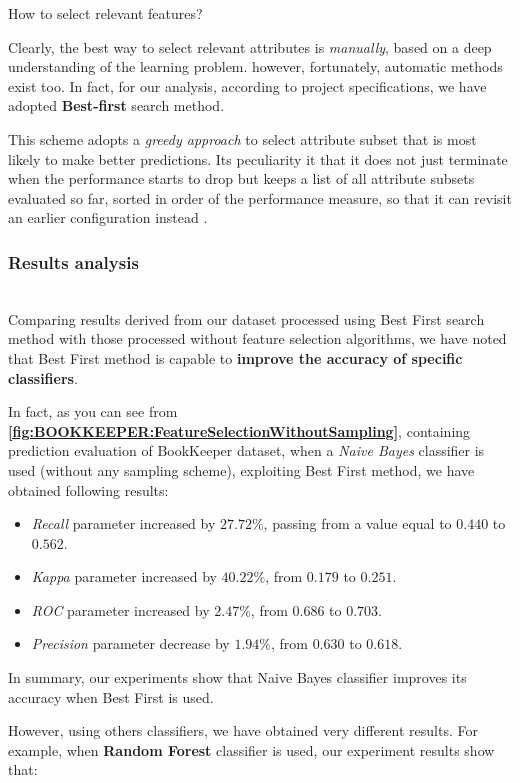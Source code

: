 \documentclass[sigconf]{acmart}
\begin{document}
How to select relevant features?

Clearly, the best way to select relevant attributes is \textit{manually}, based on a deep understanding of the learning problem. however, fortunately, automatic methods exist too. In fact, for our analysis, according to project specifications, we have adopted \textbf{Best-first} search method. 

This scheme adopts a \textit{greedy approach} to select attribute subset that is most likely to make better predictions. Its peculiarity it that it does not just terminate when the performance starts to drop but keeps a list of all attribute subsets evaluated so far, sorted in order of the performance measure, so that it can revisit an earlier configuration instead \cite{FalessiDataMining}. 

\subsubsection{Results analysis}
\hfill\\
Comparing results derived from our dataset processed using Best First search method with those processed without feature selection algorithms, we have noted that Best First method is capable to \textbf{improve the accuracy of specific classifiers}.
 
In fact, as you can see from \textbf{\cref{fig:BOOKKEEPER:FeatureSelectionWithoutSampling}}, containing prediction evaluation of BookKeeper dataset, when a \textit{Naive Bayes} classifier is used (without any sampling scheme), exploiting Best First method, we have obtained following results:

\begin{itemize}
\item \textit{Recall} parameter increased by $27.72\%$, passing from a value equal to $0.440$ to $0.562$. 
\item \textit{Kappa} parameter increased by $40.22\%$, from $0.179$ to $0.251$. 
\item \textit{ROC} parameter increased by $2.47\%$, from $0.686$ to $0.703$.
\item \textit{Precision} parameter decrease by $1.94\%$, from $0.630$ to $0.618$.
\end{itemize}
 
In summary, our experiments show that Naive Bayes classifier improves its accuracy when Best First is used. 

However, using others classifiers, we have obtained very different results. For example, when \textbf{Random Forest} classifier is used, our experiment results show that: 
\end{document}
